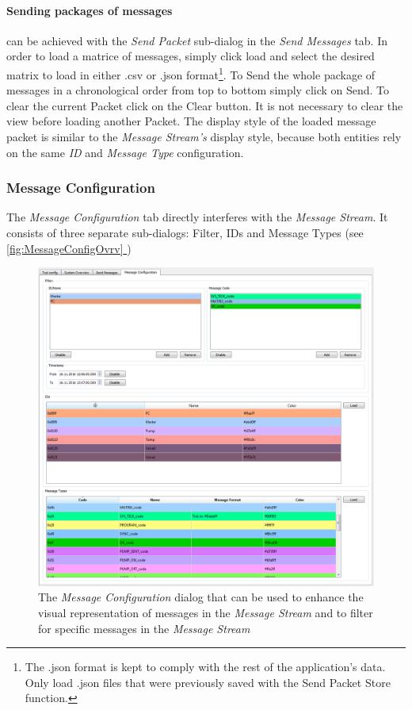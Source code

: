 \documentclass[12pt,a4paper]{scrartcl}
\newcommand*{\fullref}[1]{\hyperref[{#1}]{\autoref*{#1} \nameref*{#1}}} %
\begin{document}
\paragraph{Sending packages of messages} can be achieved with the \textit{Send Packet} sub-dialog in the \textit{Send Messages} tab. In order to load a matrice of messages, simply click load and select the desired matrix to load in either .csv or .json format\footnote{The .json format is kept to comply with the rest of the application's data. Only load .json files that were previously saved with the Send Packet Store function.}. To Send the whole package of messages in a chronological order from top to bottom simply click on Send. To clear the current Packet click on the Clear button. It is not necessary to clear the view before loading another Packet. The display style of the loaded message packet is similar to the \textit{Message Stream's} display style, because both entities rely on the same \textit{ID} and \textit{Message Type} configuration.

\FloatBarrier
\subsubsection{Message Configuration}
\label{subsubsec:GettingStartedOverviewMsgConfig}
The \textit{Message Configuration} tab directly interferes with the \textit{Message Stream}. It consists of three separate sub-dialogs: Filter, IDs and Message Types (see \fullref{fig:MessageConfigOvrv})

\begin{figure}
	\centering
	\includegraphics[width=\linewidth,keepaspectratio]{Graphics/MessageConfigOverview}
	\caption[Message Configuration Dialog]{The \textit{Message Configuration} dialog that can be used to enhance the visual representation of messages in the \textit{Message Stream} and to filter for specific messages in the \textit{Message Stream}}
	\label{fig:MessageConfigOvrv}
\end{figure}
\end{document}
